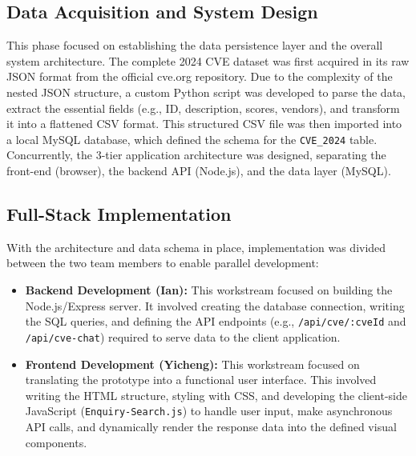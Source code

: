 \documentclass[12pt,a4paper]{article}
\begin{document}
    \subsection{Data Acquisition and System Design}
    This phase focused on establishing the data persistence layer and the overall system architecture. The complete 2024 CVE dataset was first acquired in its raw JSON format from the official cve.org repository. Due to the complexity of the nested JSON structure, a custom Python script was developed to parse the data, extract the essential fields (e.g., ID, description, scores, vendors), and transform it into a flattened CSV format. This structured CSV file was then imported into a local MySQL database, which defined the schema for the \texttt{CVE\_2024} table. Concurrently, the 3-tier application architecture was designed, separating the front-end (browser), the backend API (Node.js), and the data layer (MySQL).
    \subsection{Full-Stack Implementation}
    With the architecture and data schema in place, implementation was divided between the two team members to enable parallel development:
    \begin{itemize}[label=$\bullet$, leftmargin=*]
        \item \textbf{Backend Development (Ian):} This workstream focused on building the Node.js/Express server. It involved creating the database connection, writing the SQL queries, and defining the API endpoints (e.g., \texttt{/api/cve/:cveId} and \texttt{/api/cve-chat}) required to serve data to the client application.
        \item \textbf{Frontend Development (Yicheng):} This workstream focused on translating the prototype into a functional user interface. This involved writing the HTML structure, styling with CSS, and developing the client-side JavaScript (\texttt{Enquiry-Search.js}) to handle user input, make asynchronous API calls, and dynamically render the response data into the defined visual components.
    \end{itemize}
\end{document}
